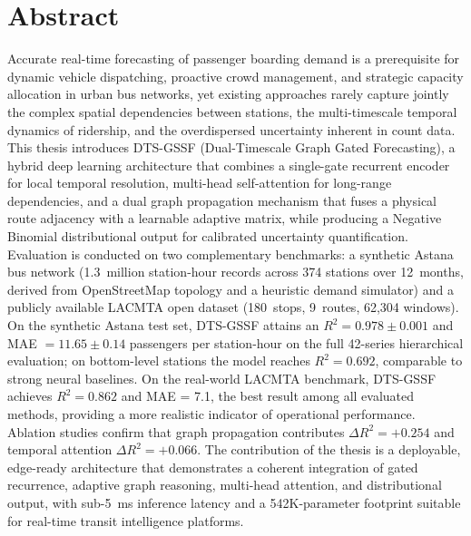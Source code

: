 %
%
\chapter{Abstract}
\begin{SingleSpace}

Accurate real-time forecasting of passenger boarding demand is a prerequisite for dynamic vehicle dispatching, proactive crowd management, and strategic capacity allocation in urban bus networks, yet existing approaches rarely capture jointly the complex spatial dependencies between stations, the multi-timescale temporal dynamics of ridership, and the overdispersed uncertainty inherent in count data. This thesis introduces DTS-GSSF (Dual-Timescale Graph Gated Forecasting), a hybrid deep learning architecture that combines a single-gate recurrent encoder for local temporal resolution, multi-head self-attention for long-range dependencies, and a dual graph propagation mechanism that fuses a physical route adjacency with a learnable adaptive matrix, while producing a Negative Binomial distributional output for calibrated uncertainty quantification. Evaluation is conducted on two complementary benchmarks: a synthetic Astana bus network (1.3~million station-hour records across 374 stations over 12~months, derived from OpenStreetMap topology and a heuristic demand simulator) and a publicly available LACMTA open dataset (180~stops, 9~routes, 62{,}304 windows). On the synthetic Astana test set, DTS-GSSF attains an $R^2 = 0.978 \pm 0.001$ and MAE $= 11.65 \pm 0.14$ passengers per station-hour on the full 42-series hierarchical evaluation; on bottom-level stations the model reaches $R^2 = 0.692$, comparable to strong neural baselines. On the real-world LACMTA benchmark, DTS-GSSF achieves $R^2 = 0.862$ and MAE = 7.1, the best result among all evaluated methods, providing a more realistic indicator of operational performance. Ablation studies confirm that graph propagation contributes $\Delta R^2 = +0.254$ and temporal attention $\Delta R^2 = +0.066$. The contribution of the thesis is a deployable, edge-ready architecture that demonstrates a coherent integration of gated recurrence, adaptive graph reasoning, multi-head attention, and distributional output, with sub-5~ms inference latency and a 542K-parameter footprint suitable for real-time transit intelligence platforms.

\vspace{5mm}

\end{SingleSpace}
